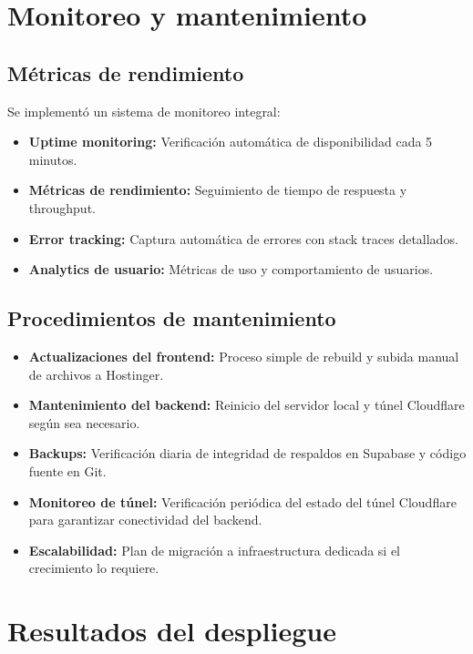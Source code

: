 \documentclass[12pt,a4paper]{report}
\begin{document}
\section{Monitoreo y mantenimiento}

\subsection{Métricas de rendimiento}

Se implementó un sistema de monitoreo integral:

\begin{itemize}
\item \textbf{Uptime monitoring:} Verificación automática de disponibilidad cada 5 minutos.
\item \textbf{Métricas de rendimiento:} Seguimiento de tiempo de respuesta y throughput.
\item \textbf{Error tracking:} Captura automática de errores con stack traces detallados.
\item \textbf{Analytics de usuario:} Métricas de uso y comportamiento de usuarios.
\end{itemize}

\subsection{Procedimientos de mantenimiento}

\begin{itemize}
\item \textbf{Actualizaciones del frontend:} Proceso simple de rebuild y subida manual de archivos a Hostinger.
\item \textbf{Mantenimiento del backend:} Reinicio del servidor local y túnel Cloudflare según sea necesario.
\item \textbf{Backups:} Verificación diaria de integridad de respaldos en Supabase y código fuente en Git.
\item \textbf{Monitoreo de túnel:} Verificación periódica del estado del túnel Cloudflare para garantizar conectividad del backend.
\item \textbf{Escalabilidad:} Plan de migración a infraestructura dedicada si el crecimiento lo requiere.
\end{itemize}

\section{Resultados del despliegue}
\end{document}
